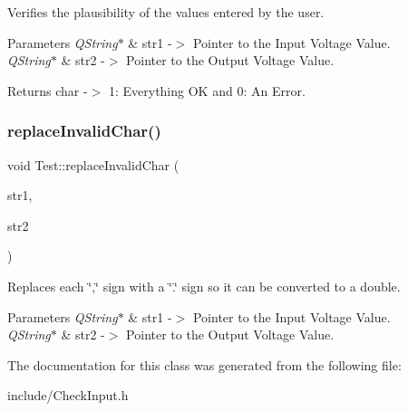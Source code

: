 Verifies the plausibility of the values entered by the user. 


\begin{DoxyParams}{Parameters}
{\em Q\+String$\ast$} & str1 -\/$>$ Pointer to the Input Voltage Value. \\
\hline
{\em Q\+String$\ast$} & str2 -\/$>$ Pointer to the Output Voltage Value. \\
\hline
\end{DoxyParams}
\begin{DoxyReturn}{Returns}
char -\/$>$ 1\+: Everything OK and 0\+: An Error. 
\end{DoxyReturn}
\mbox{\label{classTest_a83a0f09e6583bf623f84f0caa50342d9}} 
\subsubsection{\texorpdfstring{replace\+Invalid\+Char()}{replaceInvalidChar()}}
{\footnotesize\ttfamily void Test\+::replace\+Invalid\+Char (\begin{DoxyParamCaption}\item[{Q\+String \&}]{str1,  }\item[{Q\+String \&}]{str2 }\end{DoxyParamCaption})}



Replaces each \char`\"{},\char`\"{} sign with a \char`\"{}.\char`\"{} sign so it can be converted to a double. 


\begin{DoxyParams}{Parameters}
{\em Q\+String$\ast$} & str1 -\/$>$ Pointer to the Input Voltage Value. \\
\hline
{\em Q\+String$\ast$} & str2 -\/$>$ Pointer to the Output Voltage Value. \\
\hline
\end{DoxyParams}


The documentation for this class was generated from the following file\+:\begin{DoxyCompactItemize}
\item 
include/Check\+Input.\+h\end{DoxyCompactItemize}
